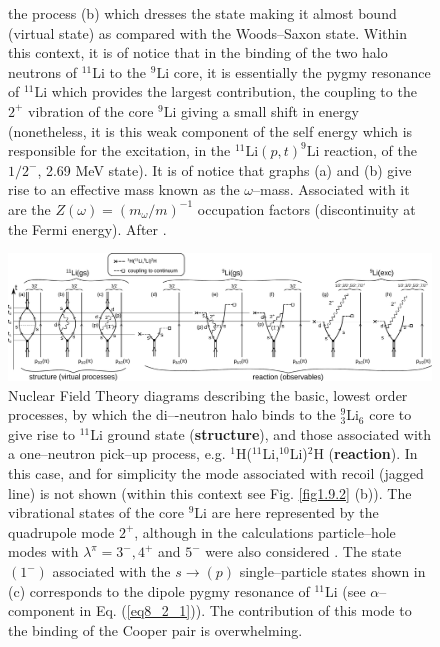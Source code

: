 \begin{figure}[h!]
{the process (b) which dresses the state making it almost bound (virtual state) as compared with the Woods--Saxon state.
Within this context, it is of notice that in the binding of the two halo neutrons of $^{11}$Li to the $^9$Li core, it is essentially the
pygmy resonance of $^{11}$Li which provides the largest contribution, the coupling to the $2^+$ vibration of the core $^9$Li giving a
small shift in energy (nonetheless, it is this weak component of the self energy which is responsible for the excitation, in the
$^{11}$Li$(p, t)^9$Li reaction, of the $1/2^−$, 2.69 MeV state).  It is of notice that graphs (a) and (b) give rise to an effective mass known as the $\omega$--mass. Associated with it are the
$Z(\omega) = (m_\omega/m)^{-1}$ occupation factors (discontinuity at the Fermi energy). After \cite{Potel:14}.}\label{fig6.2.4x}
\end{figure}
 \begin{figure}
\centerline{\includegraphics*[width=19 cm,angle=0]{C6/figs_C6/diagrams}}
\caption{Nuclear Field Theory diagrams describing the basic, lowest order processes, by which the di–-neutron halo binds to the $^9_3$Li$_6$ core to give rise to $^{11}$Li ground state 
(\textbf{structure}), and those associated with a one--neutron pick--up process, e.g.  $^1$H($^{11}$Li,$^{10}$Li)$^2$H (\textbf{reaction}). In this case, and for simplicity the mode associated with recoil (jagged line) is not shown (within this context see Fig. \ref{fig1.9.2} (b)). The vibrational states of the core $^9$Li are here represented by the quadrupole mode $2^+$, although in the calculations particle--hole modes with $\lambda^{\pi}=3^-,4^+$ and $5^-$ were also considered . The state $(1^-)$ associated with the $s\rightarrow(p)$ single--particle states shown in (c) corresponds to the  dipole pygmy resonance of $^{11}$Li (see $\alpha$--component in Eq. (\ref{eq8_2_1})). The contribution of this mode to the binding of the Cooper pair is overwhelming.}\label{fig6.1.4x}
\end{figure}

